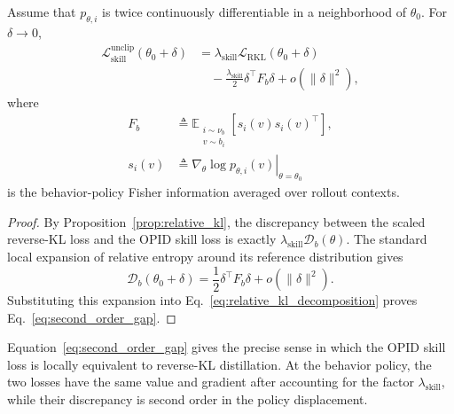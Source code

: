 \begin{corollary}
\label{cor:first_order_tightness}
Assume that \(p_{\theta,i}\) is twice continuously differentiable in a
neighborhood of \(\theta_0\). For \(\delta\to0\),
\begin{equation}
\begin{aligned}
 \mathcal L_{\mathrm{skill}}^{\mathrm{unclip}}
 (\theta_0+\delta)
 &=
 \lambda_{\mathrm{skill}}
 \mathcal L_{\mathrm{RKL}}(\theta_0+\delta)
 \\
 &\quad-
 \frac{\lambda_{\mathrm{skill}}}{2}
 \delta^\top F_b\delta
 +
 o(\|\delta\|^2),
\end{aligned}
\label{eq:second_order_gap}
\end{equation}
where
\begin{equation*}
\begin{aligned}
 F_b
 &\triangleq
 \mathbb E_{\substack{i\sim\nu_b\\v\sim b_i}}
 \left[
   s_i(v)s_i(v)^\top
 \right],
 \\
 s_i(v)
 &\triangleq
 \left.
 \nabla_\theta\log p_{\theta,i}(v)
 \right|_{\theta=\theta_0}
\end{aligned}
\end{equation*}
is the behavior-policy Fisher information averaged over rollout contexts.
\end{corollary}


\begin{proof}
By Proposition~\ref{prop:relative_kl}, the discrepancy between the scaled
reverse-KL loss and the OPID skill loss is exactly
\(\lambda_{\mathrm{skill}}\mathcal D_b(\theta)\). The standard local
expansion of relative entropy around its reference distribution gives
\begin{equation*}
 \mathcal D_b(\theta_0+\delta)
 =
 \frac12
 \delta^\top F_b\delta
 +
 o(\|\delta\|^2).
\end{equation*}
Substituting this expansion into
Eq.~\ref{eq:relative_kl_decomposition} proves
Eq.~\ref{eq:second_order_gap}.
\end{proof}

Equation~\ref{eq:second_order_gap} gives the precise sense in which the
OPID skill loss is locally equivalent to reverse-KL distillation. At the
behavior policy, the two losses have the same value and gradient after
accounting for the factor \(\lambda_{\mathrm{skill}}\), while their
discrepancy is second order in the policy displacement.


